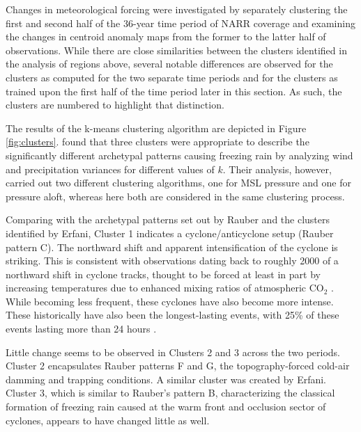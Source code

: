 \documentclass[twocol]{ametsoc}
\begin{document}
Changes in meteorological forcing were investigated by separately clustering the first and second half of the 36-year time period of NARR coverage and examining the changes in centroid anomaly maps from the former to the  latter half of observations. While there are close similarities between the clusters identified in the analysis of regions above, several notable differences are observed for the clusters as computed for the two separate time periods and for the clusters as trained upon the first half of the time period later in this section. As such, the clusters are numbered to highlight that distinction.



The results of the k-means clustering algorithm are depicted in Figure \ref{fig:clusters}. \citet{erfani2012automated} found that three clusters were appropriate to describe the significantly different archetypal patterns causing freezing rain by analyzing wind and precipitation variances for different values of $k$. Their analysis, however, carried out two different clustering algorithms, one for MSL pressure and one for pressure aloft, whereas here both are considered in the same clustering process. 



Comparing with the archetypal patterns set out by Rauber and the clusters identified by Erfani, Cluster 1 indicates a cyclone/anticyclone setup (Rauber pattern C). The northward shift and apparent intensification of the cyclone is striking. This is consistent with observations dating back to roughly 2000 of a northward shift in cyclone tracks, thought to be forced at least in part by increasing temperatures due to enhanced mixing ratios of atmospheric CO$_2$ \citep{mccabe2001trends}. While becoming less frequent, these cyclones have also become more intense. These historically have also been the longest-lasting events, with 25\% of these events lasting more than 24 hours \citep{rauber2001synoptic}. 



Little change seems to be observed in Clusters 2 and 3 across the two periods. Cluster 2 encapsulates Rauber patterns F and G, the topography-forced cold-air damming and trapping conditions. A similar cluster was created by Erfani. Cluster 3, which is similar to Rauber's pattern B, characterizing the classical formation of freezing rain caused at the warm front and occlusion sector of cyclones, appears to have changed little as well.
\end{document}
